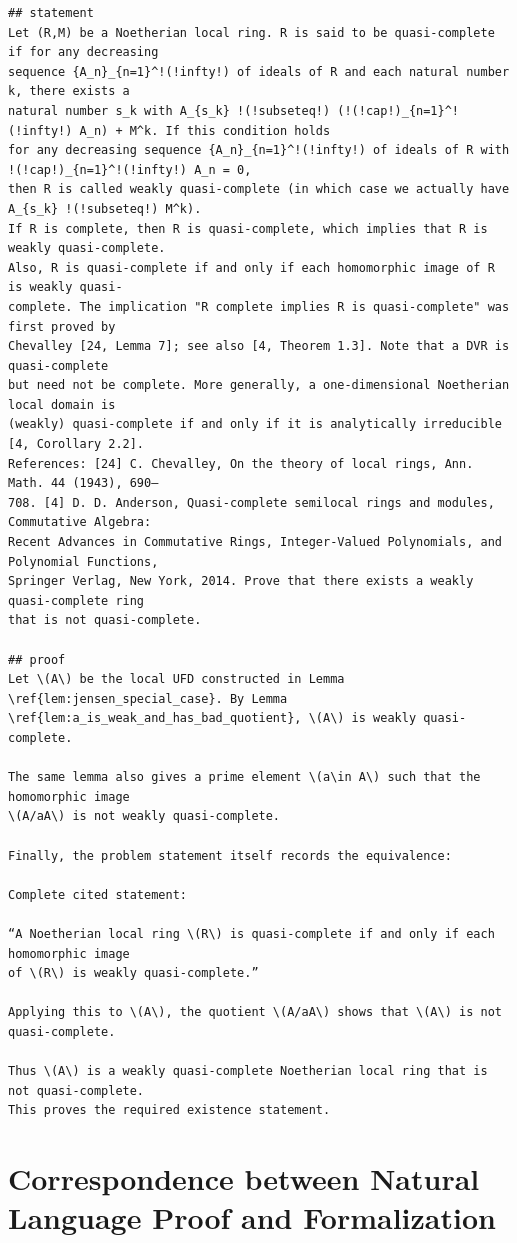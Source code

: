 \documentclass[]{pkuai4m}
\theoremstyle{plain}
\theoremstyle{definition}
\begin{document}
\begin{Verbatim}[commandchars=!??]
## statement
Let (R,M) be a Noetherian local ring. R is said to be quasi-complete if for any decreasing
sequence {A_n}_{n=1}^!(!infty!) of ideals of R and each natural number k, there exists a 
natural number s_k with A_{s_k} !(!subseteq!) (!(!cap!)_{n=1}^!(!infty!) A_n) + M^k. If this condition holds 
for any decreasing sequence {A_n}_{n=1}^!(!infty!) of ideals of R with !(!cap!)_{n=1}^!(!infty!) A_n = 0, 
then R is called weakly quasi-complete (in which case we actually have A_{s_k} !(!subseteq!) M^k). 
If R is complete, then R is quasi-complete, which implies that R is weakly quasi-complete. 
Also, R is quasi-complete if and only if each homomorphic image of R is weakly quasi-
complete. The implication "R complete implies R is quasi-complete" was first proved by 
Chevalley [24, Lemma 7]; see also [4, Theorem 1.3]. Note that a DVR is quasi-complete 
but need not be complete. More generally, a one-dimensional Noetherian local domain is 
(weakly) quasi-complete if and only if it is analytically irreducible [4, Corollary 2.2]. 
References: [24] C. Chevalley, On the theory of local rings, Ann. Math. 44 (1943), 690–
708. [4] D. D. Anderson, Quasi-complete semilocal rings and modules, Commutative Algebra:
Recent Advances in Commutative Rings, Integer-Valued Polynomials, and Polynomial Functions, 
Springer Verlag, New York, 2014. Prove that there exists a weakly quasi-complete ring 
that is not quasi-complete.

## proof
Let \(A\) be the local UFD constructed in Lemma \ref{lem:jensen_special_case}. By Lemma 
\ref{lem:a_is_weak_and_has_bad_quotient}, \(A\) is weakly quasi-complete.

The same lemma also gives a prime element \(a\in A\) such that the homomorphic image 
\(A/aA\) is not weakly quasi-complete.

Finally, the problem statement itself records the equivalence:

Complete cited statement:

“A Noetherian local ring \(R\) is quasi-complete if and only if each homomorphic image 
of \(R\) is weakly quasi-complete.”

Applying this to \(A\), the quotient \(A/aA\) shows that \(A\) is not quasi-complete.

Thus \(A\) is a weakly quasi-complete Noetherian local ring that is not quasi-complete. 
This proves the required existence statement.
\end{Verbatim}


\section{Correspondence between Natural Language Proof and Formalization}
\end{document}
